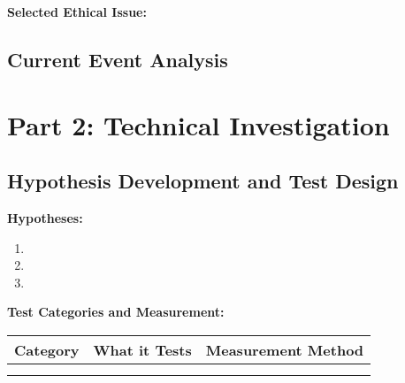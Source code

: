 \documentclass[11pt]{article}
\begin{document}
\textbf{Selected Ethical Issue:} %


\subsection{Current Event Analysis}


\section{Part 2: Technical Investigation}

\subsection{Hypothesis Development and Test Design}

\textbf{Hypotheses:}
\begin{enumerate}
    \item %
    \item %
    \item %
\end{enumerate}

\textbf{Test Categories and Measurement:}

\begin{center}
\begin{tabular}{|p{3cm}|p{4cm}|p{4cm}|}
\hline
\textbf{Category} & \textbf{What it Tests} & \textbf{Measurement Method} \\
\hline
 &  &  \\
\hline
 &  &  \\
\hline
\end{tabular}
\end{center}
\end{document}
